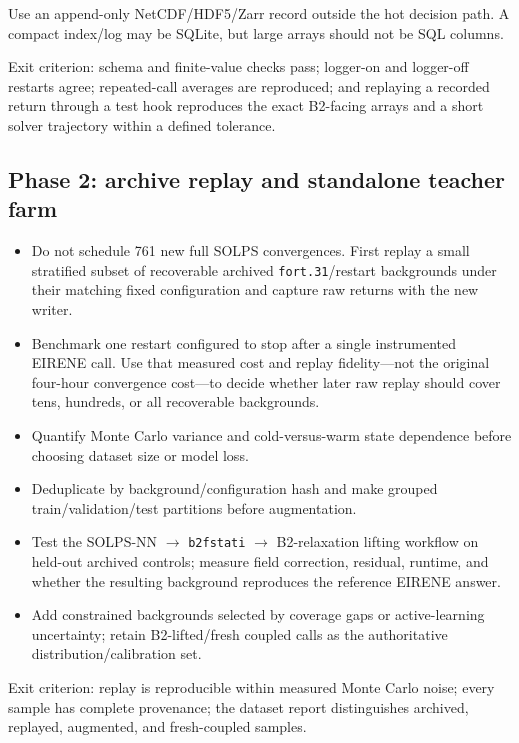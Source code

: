 \documentclass[11pt]{article}
\begin{document}
Use an append-only NetCDF/HDF5/Zarr record outside the hot decision path. A compact index/log may be SQLite, but large arrays should not be SQL columns.

Exit criterion: schema and finite-value checks pass; logger-on and logger-off
restarts agree; repeated-call averages are reproduced; and replaying a
recorded return through a test hook reproduces the exact B2-facing arrays and
a short solver trajectory within a defined tolerance.

\subsection{Phase 2: archive replay and standalone teacher farm}

\begin{itemize}
\item Do not schedule 761 new full SOLPS convergences. First replay a small stratified subset of recoverable archived \texttt{fort.31}/restart backgrounds under their matching fixed configuration and capture raw returns with the new writer.
\item Benchmark one restart configured to stop after a single instrumented EIRENE call. Use that measured cost and replay fidelity---not the original four-hour convergence cost---to decide whether later raw replay should cover tens, hundreds, or all recoverable backgrounds.
\item Quantify Monte Carlo variance and cold-versus-warm state dependence before choosing dataset size or model loss.
\item Deduplicate by background/configuration hash and make grouped train/validation/test partitions before augmentation.
\item Test the SOLPS-NN $\rightarrow$ \texttt{b2fstati} $\rightarrow$ B2-relaxation lifting workflow on held-out archived controls; measure field correction, residual, runtime, and whether the resulting background reproduces the reference EIRENE answer.
\item Add constrained backgrounds selected by coverage gaps or active-learning uncertainty; retain B2-lifted/fresh coupled calls as the authoritative distribution/calibration set.
\end{itemize}

Exit criterion: replay is reproducible within measured Monte Carlo noise; every sample has complete provenance; the dataset report distinguishes archived, replayed, augmented, and fresh-coupled samples.
\end{document}
